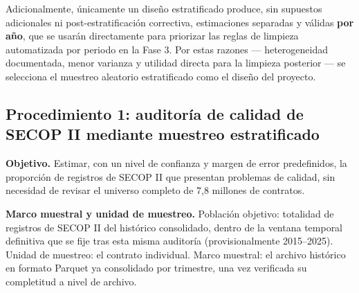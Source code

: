 \documentclass[11pt,letterpaper]{article}
\begin{document}
Adicionalmente, únicamente un diseño estratificado produce, sin supuestos
adicionales ni post-estratificación correctiva, estimaciones separadas y
válidas \textbf{por año}, que se usarán directamente para priorizar las reglas
de limpieza automatizada por periodo en la Fase 3. Por estas razones ---
heterogeneidad documentada, menor varianza y utilidad directa para la limpieza
posterior --- se selecciona el muestreo aleatorio estratificado como el diseño
del proyecto.

\subsection{Procedimiento 1: auditoría de calidad de SECOP II mediante muestreo estratificado}

\textbf{Objetivo.} Estimar, con un nivel de confianza y margen de error
predefinidos, la proporción de registros de SECOP II que presentan problemas
de calidad, sin necesidad de revisar el universo completo de 7,8 millones de
contratos.

\textbf{Marco muestral y unidad de muestreo.} Población objetivo: totalidad de
registros de SECOP II del histórico consolidado, dentro de la ventana temporal
definitiva que se fije tras esta misma auditoría (provisionalmente
2015--2025). Unidad de muestreo: el contrato individual. Marco muestral: el
archivo histórico en formato Parquet ya consolidado por trimestre, una vez
verificada su completitud a nivel de archivo.
\end{document}
